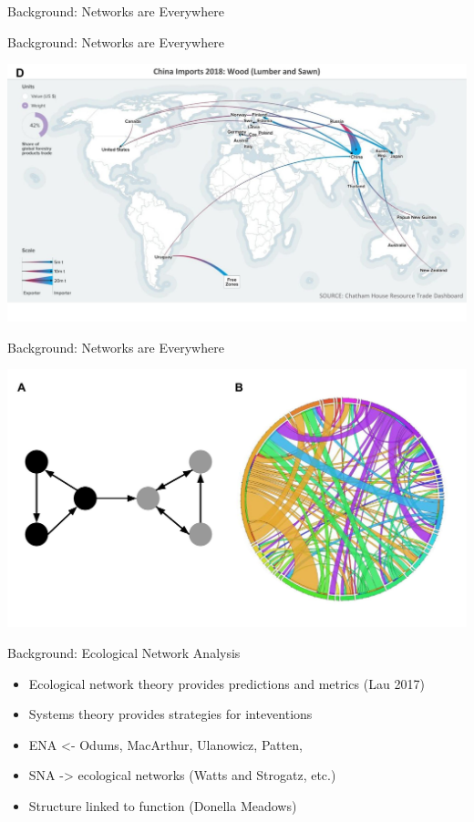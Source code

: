 \documentclass[ignorenonframetext,]{beamer}
\providecommand{\tightlist}{%
  \setlength{\itemsep}{0pt}\setlength{\parskip}{0pt}}
\begin{document}
\begin{frame}{Background: Networks are Everywhere}
\protect\hypertarget{background-networks-are-everywhere}{}

\end{frame}

\begin{frame}{Background: Networks are Everywhere}
\protect\hypertarget{background-networks-are-everywhere-1}{}

\begin{center}\includegraphics[width=0.5\linewidth]{images/resourcetrade_network} \end{center}

\end{frame}

\begin{frame}{Background: Networks are Everywhere}
\protect\hypertarget{background-networks-are-everywhere-2}{}

\begin{center}\includegraphics[width=0.5\linewidth]{images/example_network} \end{center}

\end{frame}

\begin{frame}{Background: Ecological Network Analysis}
\protect\hypertarget{background-ecological-network-analysis}{}

\begin{itemize}
\tightlist
\item
  Ecological network theory provides predictions and metrics (Lau 2017)
\item
  Systems theory provides strategies for inteventions
\item
  ENA \textless{}- Odums, MacArthur, Ulanowicz, Patten,
\item
  SNA -\textgreater{} ecological networks (Watts and Strogatz, etc.)
\item
  Structure linked to function (Donella Meadows)
\end{itemize}

\end{frame}
\end{document}
